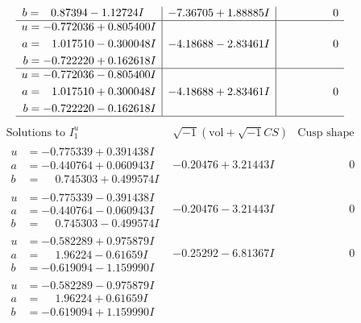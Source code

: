 \documentclass[1p]{elsarticle_modified}
\theoremstyle{definition}
\newcommand{\I}{\sqrt{-1}}
\begin{document}
$$\begin{array}{c|c|c}
\begin{aligned}
b &= \phantom{-}0.87394 - 1.12724 I\end{aligned}
 & -7.36705 + 1.88885 I & \phantom{-0.000000 } 0 \\ \hline\begin{aligned}
u &= -0.772036 + 0.805400 I \\
a &= \phantom{-}1.017510 - 0.300048 I \\
b &= -0.722220 + 0.162618 I\end{aligned}
 & -4.18688 - 2.83461 I & \phantom{-0.000000 } 0 \\ \hline\begin{aligned}
u &= -0.772036 - 0.805400 I \\
a &= \phantom{-}1.017510 + 0.300048 I \\
b &= -0.722220 - 0.162618 I\end{aligned}
 & -4.18688 + 2.83461 I & \phantom{-0.000000 } 0\\
 \hline 
 \end{array}$$\newpage$$\begin{array}{c|c|c}  
\text{Solutions to }I^u_{1}& \I (\text{vol} + \sqrt{-1}CS) & \text{Cusp shape}\\
 \hline 
\begin{aligned}
u &= -0.775339 + 0.391438 I \\
a &= -0.440764 + 0.060943 I \\
b &= \phantom{-}0.745303 + 0.499574 I\end{aligned}
 & -0.20476 + 3.21443 I & \phantom{-0.000000 } 0 \\ \hline\begin{aligned}
u &= -0.775339 - 0.391438 I \\
a &= -0.440764 - 0.060943 I \\
b &= \phantom{-}0.745303 - 0.499574 I\end{aligned}
 & -0.20476 - 3.21443 I & \phantom{-0.000000 } 0 \\ \hline\begin{aligned}
u &= -0.582289 + 0.975879 I \\
a &= \phantom{-}1.96224 - 0.61659 I \\
b &= -0.619094 - 1.159990 I\end{aligned}
 & -0.25292 - 6.81367 I & \phantom{-0.000000 } 0 \\ \hline\begin{aligned}
u &= -0.582289 - 0.975879 I \\
a &= \phantom{-}1.96224 + 0.61659 I \\
b &= -0.619094 + 1.159990 I\end{aligned}

\end{array}$$
\end{document}
